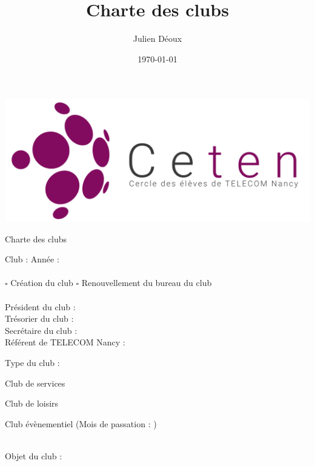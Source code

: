 \documentclass{article} %
\title{Charte des clubs}
\author{Julien Déoux}
\date\today
\begin{document}

	
	\begin{titlepage}
		\begin{center}
			\includegraphics[width=\textwidth]{images/ceten.png}\par
			\vspace{1.5cm}
			{\Huge \light Charte des clubs}\par
			\vspace{1.5cm}
		\end{center}
		\begin{center}
			Club : \underline{\hspace{8cm}}
			Année : \underline{\hspace{1.5cm}}\\
			~\\
			$\square$ Création du club
			\hspace{3cm}
			$\square$ Renouvellement du bureau du club\\
			~\\
			Président du club : \underline{\hspace{7cm}}\\
			Trésorier du club : \underline{\hspace{7cm}}\\
			Secrétaire du club : \underline{\hspace{7cm}}\\
			Référent de TELECOM Nancy : \underline{\hspace{7cm}}\\
		\end{center}
		Type du club :
		\begin{todolist}
			\item Club de services
			\item Club de loisirs
			\item Club évènementiel (Mois de passation :
				\underline{\hspace{5cm}})
		\end{todolist}
		~\\
		Objet du club :\\
		\underline{\hspace{\textwidth}}
		\underline{\hspace{\textwidth}}
		\underline{\hspace{\textwidth}}
		\underline{\hspace{\textwidth}}
		\underline{\hspace{\textwidth}}
 

\end{titlepage}
\end{document}
